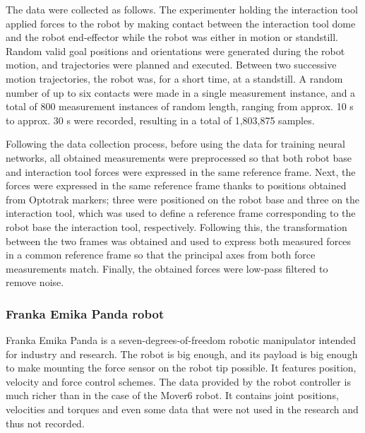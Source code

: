 The data were collected as follows. The experimenter holding the interaction tool applied forces to the robot by making contact between the interaction tool dome and the robot end-effector while the robot was either in motion or standstill. Random valid goal positions and orientations were generated during the robot motion, and trajectories were planned and executed. Between two successive motion trajectories, the robot was, for a short time, at a standstill. A random number of up to six contacts were made in a single measurement instance, and a total of 800 measurement instances of random length, ranging from approx. 10 s to approx. 30 s were recorded, resulting in a total of 1,803,875 samples. 

Following the data collection process, before using the data for training neural networks, all obtained measurements were preprocessed so that both robot base and interaction tool forces were expressed in the same reference frame. Next, the forces were expressed in the same reference frame thanks to positions obtained from Optotrak markers; three were positioned on the robot base and three on the interaction tool, which was used to define a reference frame corresponding to the robot base the interaction tool, respectively. Following this, the transformation between the two frames was obtained and used to express both measured forces in a common reference frame so that the principal axes from both force measurements match. Finally, the obtained forces were low-pass filtered to remove noise.

\subsubsection{Franka Emika Panda robot}

Franka Emika Panda \cite{FrankaRobot} is a seven-degrees-of-freedom robotic manipulator intended for industry and research. The robot is big enough, and its payload is big enough to make mounting the force sensor on the robot tip possible. It features position, velocity and force control schemes. The data provided by the robot controller is much richer than in the case of the Mover6 robot. It contains joint positions, velocities and torques and even some data that were not used in the research and thus not recorded.


